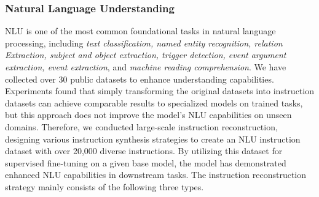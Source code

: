 \documentclass{article}
\begin{document}
\subsubsection{Natural Language Understanding}
NLU is one of the most common foundational tasks in natural language processing, including \textit{text classification, named entity recognition, relation Extraction, subject and object extraction, trigger detection, event argument extraction, event extraction}, and \textit{machine reading comprehension}. We have collected over 30 public datasets to enhance understanding capabilities. Experiments found that simply transforming the original datasets into instruction datasets can achieve comparable results to specialized models on trained tasks, but this approach does not improve the model's NLU capabilities on unseen domains. Therefore, we conducted large-scale instruction reconstruction, designing various instruction synthesis strategies to create an NLU instruction dataset with over 20,000 diverse instructions. By utilizing this dataset for supervised fine-tuning on a given base model, the model has demonstrated enhanced NLU capabilities in downstream tasks. The instruction reconstruction strategy mainly consists of the following three types.
\end{document}
